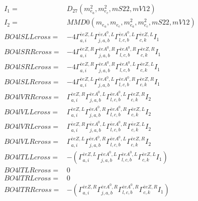 \documentclass[A4,landscape]{article}
\begin{document}
\begin{align} 
I_1 = & D_{27}(m^2_{e_{{a}}}, m^2_{e_{{c}}}, mS22, mV12) \\ 
I_2 = & MMD0(m_{e_{{a}}}, m_{e_{{c}}}, m^2_{e_{{a}}}, m^2_{e_{{c}}}, mS22, mV12) \\ 
  BO4lSLLcross= & -4  \Gamma^{\bar{e}e Z ,L}_{a, i} \Gamma^{\bar{e}e A^0 ,L}_{j, a, b} \Gamma^{\bar{e}e A^0 ,L}_{l, c, b} \Gamma^{\bar{e}e Z ,L}_{c, k} I_1 \\ 
  BO4lSRRcross= & -4  \Gamma^{\bar{e}e Z ,R}_{a, i} \Gamma^{\bar{e}e A^0 ,R}_{j, a, b} \Gamma^{\bar{e}e A^0 ,R}_{l, c, b} \Gamma^{\bar{e}e Z ,R}_{c, k} I_1 \\ 
  BO4lSRLcross= & -4  \Gamma^{\bar{e}e Z ,R}_{a, i} \Gamma^{\bar{e}e A^0 ,R}_{j, a, b} \Gamma^{\bar{e}e A^0 ,L}_{l, c, b} \Gamma^{\bar{e}e Z ,L}_{c, k} I_1 \\ 
  BO4lSLRcross= & -4  \Gamma^{\bar{e}e Z ,L}_{a, i} \Gamma^{\bar{e}e A^0 ,L}_{j, a, b} \Gamma^{\bar{e}e A^0 ,R}_{l, c, b} \Gamma^{\bar{e}e Z ,R}_{c, k} I_1 \\ 
  BO4lVRRcross= &  \Gamma^{\bar{e}e Z ,R}_{a, i} \Gamma^{\bar{e}e A^0 ,L}_{j, a, b} \Gamma^{\bar{e}e A^0 ,L}_{l, c, b} \Gamma^{\bar{e}e Z ,R}_{c, k} I_2 \\ 
  BO4lVLLcross= &  \Gamma^{\bar{e}e Z ,L}_{a, i} \Gamma^{\bar{e}e A^0 ,R}_{j, a, b} \Gamma^{\bar{e}e A^0 ,R}_{l, c, b} \Gamma^{\bar{e}e Z ,L}_{c, k} I_2 \\ 
  BO4lVRLcross= &  \Gamma^{\bar{e}e Z ,R}_{a, i} \Gamma^{\bar{e}e A^0 ,L}_{j, a, b} \Gamma^{\bar{e}e A^0 ,R}_{l, c, b} \Gamma^{\bar{e}e Z ,L}_{c, k} I_2 \\ 
  BO4lVLRcross= &  \Gamma^{\bar{e}e Z ,L}_{a, i} \Gamma^{\bar{e}e A^0 ,R}_{j, a, b} \Gamma^{\bar{e}e A^0 ,L}_{l, c, b} \Gamma^{\bar{e}e Z ,R}_{c, k} I_2 \\ 
  BO4lTLLcross= & -( \Gamma^{\bar{e}e Z ,L}_{a, i} \Gamma^{\bar{e}e A^0 ,L}_{j, a, b} \Gamma^{\bar{e}e A^0 ,L}_{l, c, b} \Gamma^{\bar{e}e Z ,L}_{c, k} I_1) \\ 
  BO4lTLRcross= & 0 \\ 
  BO4lTRLcross= & 0 \\ 
  BO4lTRRcross= & -( \Gamma^{\bar{e}e Z ,R}_{a, i} \Gamma^{\bar{e}e A^0 ,R}_{j, a, b} \Gamma^{\bar{e}e A^0 ,R}_{l, c, b} \Gamma^{\bar{e}e Z ,R}_{c, k} I_1) \\ 
\end{align} 
\end{document}
